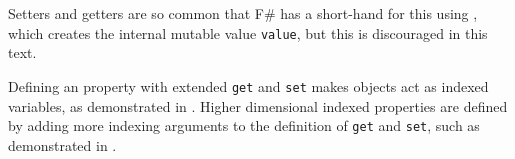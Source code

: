 Setters and getters are so common that F\# has a short-hand for this using , which creates the internal mutable value \lstinline{value}, but this is discouraged in this text.

Defining an  property with extended \lstinline{get} and \lstinline{set} makes objects act as indexed variables, as demonstrated in .
%
% 
Higher dimensional indexed properties are defined by adding more indexing arguments to the definition of \lstinline{get} and \lstinline{set}, such as demonstrated in .
%
% 


